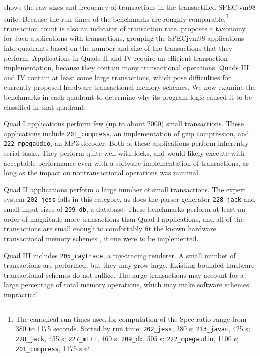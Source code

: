  shows the raw sizes and frequency of transactions in
the transactified SPECjvm98 suite.  Because the run times of the
benchmarks are roughly comparable,\footnote{The canonical run times
  used for computation of the Spec ratio range from 380 to 1175
  seconds.  Sorted by run time: \texttt{202\_jess}, 380 s;
  \texttt{213\_javac}, 425 s; \texttt{228\_jack}, 455 s;
  \texttt{227\_mtrt}, 460 s; \texttt{209\_db}, 505 s;
  \texttt{222\_mpegaudio}, 1100 s; \texttt{201\_compress}, 1175 s.}
transaction count is also an indicator of transaction rate.
 proposes a
taxonomy for Java applications with transactions, grouping the SPECjvm98
applications into quadrants based on the number and size of the
transactions that they perform.  Applications in Quads II and IV
require an efficient transaction implementation, because they contain
many transactional operations.
Quads III and IV contain at least some large transactions, which
pose difficulties for currently proposed hardware transactional memory
schemes.  We now
examine the benchmarks in each quadrant to determine why its program
logic caused it to be classified in that quadrant.

Quad I applications perform few (up to about 2000) small
transactions.  These applications include \texttt{201\_compress}, an
implementation of gzip compression, and \texttt{222\_mpegaudio}, an
MP3 decoder.  Both of these applications perform inherently serial
tasks.  They perform quite well with locks, and would likely execute
with acceptable performance even with a \naive software
implementation of transactions, as long as the impact on
nontransactional operations was minimal.

Quad II applications perform a large number of small transactions.
The expert system \texttt{202\_jess} falls in this category, as does
the parser generator \texttt{228\_jack} and
small input sizes of \texttt{209\_db}, a database.  These benchmarks
perform at least an order of magnitude more transactions than Quad
I applications, and all of the transactions are small enough to 
comfortably fit the known hardware transactional memory schemes
\cite[etc]{HerlihyMo93}, if
one were to be implemented.

Quad III includes \texttt{205\_raytrace}, a ray-tracing renderer.  A
small number of transactions are performed, but they may grow
large.  Existing bounded hardware transactional schemes do not
suffice.  The large
transactions may account for a large percentage of total memory
operations, which may make software schemes
impractical.

